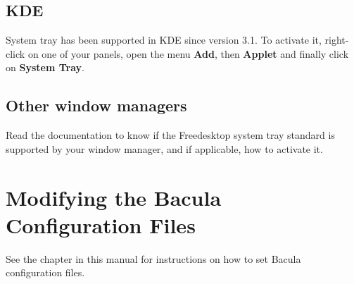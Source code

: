 \subsection{KDE}

System tray has been supported in KDE since version 3.1. To activate it,
right-click on one of your panels, open the menu {\bf Add}, then {\bf Applet}
and finally click on {\bf System Tray}. 

\subsection{Other window managers}

Read the documentation to know if the Freedesktop system tray standard is
supported by your window manager, and if applicable, how to activate it. 

\section{Modifying the Bacula Configuration Files}

See the chapter 
 in this manual for
instructions on how to set Bacula configuration files. 
